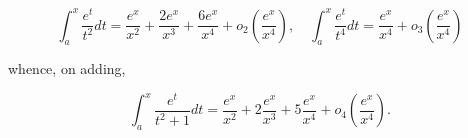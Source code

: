 \[
\int_ {a} ^ {x} \frac {e ^ {t}}{t ^ {2}} d t = \frac {e ^ {x}}{x ^ {2}} + \frac {2 e ^ {x}}{x ^ {3}} + \frac {6 e ^ {x}}{x ^ {4}} + o _ {2} \left(\frac {e ^ {x}}{x ^ {4}}\right), \quad \int_ {a} ^ {x} \frac {e ^ {t}}{t ^ {4}} d t = \frac {e ^ {x}}{x ^ {4}} + o _ {3} \left(\frac {e ^ {x}}{x ^ {4}}\right)
\]

whence, on adding,

\[
\int_ {a} ^ {x} \frac {e ^ {t}}{t ^ {2} + 1} d t = \frac {e ^ {x}}{x ^ {2}} + 2 \frac {e ^ {x}}{x ^ {3}} + 5 \frac {e ^ {x}}{x ^ {4}} + o _ {4} \left(\frac {e ^ {x}}{x ^ {4}}\right).
\]

